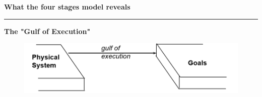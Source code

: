 \documentclass[pdf]{beamer}
\begin{document}
\begin{frame} 
\vspace{8mm}
\textcolor{myBlue}{\textbf{\Large{What the four stages model reveals}}}

\textcolor{red}{\rule{10cm}{1mm}}

\textbf{The "Gulf of Execution"}

\begin{figure} 
	\includegraphics[scale=0.5]{15_Picture1.png}
\end{figure}
\end{frame}
\end{document}
